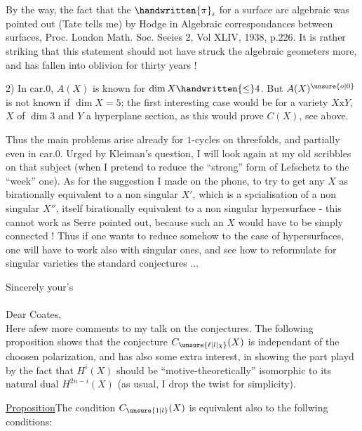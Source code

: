 By the way, the fact that the $\handwritten{\pi}_{i}$ for a surface are algebraic was
pointed out (Tate tells me) by Hodge in Algebraic correspondances between
surfaces, Proc. London Math. Soc. Seeies 2, Vol XLIV, 1938, p.226. It is
rather striking that this statement should not have struck the algebraic
geometers more, and has fallen into oblivion for  thirty years !

2) In car.$0$, $A(X)$ is known for $\dim X\handwritten{\leq}4$. But $A(X)^{\unsure{o|0}}$ is not known if
$\dim X=5$; the first interesting case would be for a variety $X\mathbin{\mathrm{x}}Y$, $X$
of $\dim 3$ and $Y$ a hyperplane section, as this would prove $C(X)$, see above.

Thus the main problems arise already for $1$-cycles on threefolds,
and partially even in car.$0$. Urged by Kleiman's question, I will look
again at my old scribbles on that subject (when I pretend to reduce the
``strong'' form of Lefschetz to the ``week'' one). As for the suggestion I
made on the phone, to try to get any $X$ as birationally equivalent to a
non singular $X'$, which is a spcialisation of a non singular $X''$, itself
birationally equivalent to a non singular hypersurface - this cannot
work as Serre pointed out, because such an $X$ would have to be simply connected !
Thus if one wants to reduce somehow to the case of hypersurfaces,
one will have to work also with singular ones, and see how to reformulate
for singular varieties the standard conjectures ...

Sincerely your's\\

\hfill{}\\
Dear Coates,\\

Here a\handwritten{$\vert$}few more comments to my talk on the conjectures. The following
proposition shows that the conjecture $C_{\unsure{\ell|l|\chi}}(X)$ is independant of the choosen
polarization, and has also some extra interest, in showing the part playd
by the fact that $H^{i}(X)$ should be ``motive-theoretically'' isomorphic to
its natural dual $H^{2n-i}(X)$ (as usual, I drop the twist for simplicity).

\uline{Proposition}\quad The condition $C_{\unsure{1|l}}(X)$ is equivalent also to  the follwing
conditions:

